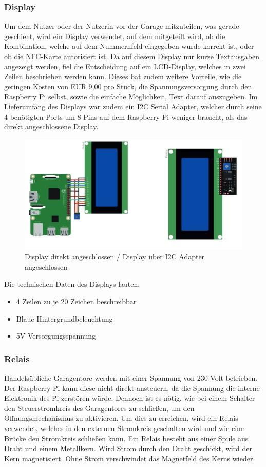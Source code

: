 \subsubsection{Display}
Um dem Nutzer oder der Nutzerin vor der Garage mitzuteilen, was gerade geschieht, wird ein Display verwendet, auf dem mitgeteilt wird, ob die Kombination, welche auf dem Nummernfeld eingegeben wurde korrekt ist, oder ob die NFC-Karte autorisiert ist.
Da auf diesem Display nur kurze Textausgaben angezeigt werden, fiel die Entscheidung auf ein LCD-Display, welches in zwei Zeilen beschrieben werden kann. Dieses bat zudem weitere Vorteile, wie die geringen Kosten von EUR 9,00 pro Stück, die Spannungsversorgung durch den Raspberry Pi selbst, sowie die einfache Möglichkeit, Text darauf auszugeben.
Im Lieferumfang des Displays war zudem ein I2C Serial Adapter, welcher durch seine 4 benötigten Ports um 8 Pins auf dem Raspberry Pi weniger braucht, als das direkt angeschlossene Display.
\cite{DifferentConnectionTypesDisplay}
\begin{figure}[H]
  \centering
  \includegraphics[width=15cm]{pics/DisplayComparison.jpg}
  \caption{Display direkt angeschlossen / Display über I2C Adapter angeschlossen}
\end{figure}
Die technischen Daten des Displays lauten:
\begin{itemize}
  \item 4 Zeilen zu je 20 Zeichen beschreibbar
  \item Blaue Hintergrundbeleuchtung
  \item 5V Versorgungsspannung
\end{itemize}
\cite{RaspberryDisplay}

 \subsubsection{Relais}
Handelsübliche Garagentore werden mit einer Spannung von 230 Volt betrieben. Der Raspberry Pi kann diese nicht direkt ansteuern, da die Spannung die interne Elektronik des Pi zerstören würde. Dennoch ist es nötig, wie bei einem Schalter den Steuerstromkreis des Garagentores zu schließen, um den Öffnungsmechanismus zu aktivieren. Um dies zu erreichen, wird ein Relais verwendet, welches in den externen Stromkreis geschalten wird und wie eine Brücke den Stromkreis schließen kann. Ein Relais besteht aus einer Spule aus Draht und einem Metallkern. Wird Strom durch den Draht geschickt, wird der Kern magnetisiert. Ohne Strom verschwindet das Magnetfeld des Kerns wieder.

